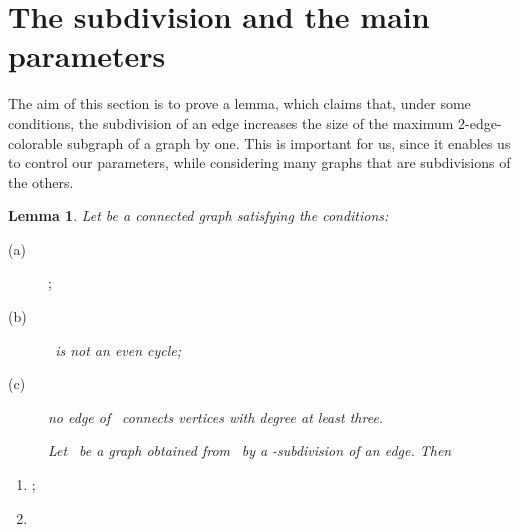 \documentclass[fleqn,12pt,twoside]{article}
\newtheorem{lemma}{Lemma}
\begin{document}
\section{The subdivision and the main parameters}

The aim of this section is to prove a lemma, which claims that,
under some conditions, the subdivision of an edge increases the size
of the maximum 2-edge-colorable subgraph of a graph by one. This is
important for us, since it enables us to control our parameters,
while considering many graphs that are subdivisions of the others.

\begin{lemma}
\label{Edge Subdivision}Let  be a connected graph satisfying the
conditions:
\end{lemma}

\begin{description}
\item[(a)] ;

\item[(b)] \textit{\ is not an even cycle;}

\item[(c)] \textit{no edge of }\textit{\ connects vertices with degree at
least three.}

\item[ ] \textit{Let }\textit{\ be a graph obtained from }\textit{\ by a }\textit{-subdivision of an edge. Then}
\end{description}

\begin{enumerate}
\item[(1)] ;

\item[(2)] 
\end{enumerate}
\end{document}
